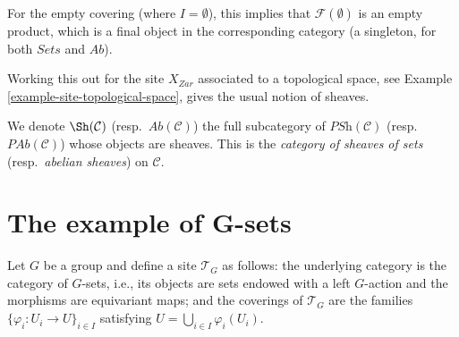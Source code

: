 \begin{remark}
\label{remark-empty-covering}
For the empty covering (where $I = \emptyset$), this implies that
$\mathcal{F}(\emptyset)$ is an empty product, which is a final object in the
corresponding category (a singleton, for both $\textit{Sets}$ and
$\textit{Ab}$).
\end{remark}

\begin{example}
\label{example-sheaf-site-space}
Working this out for the site $X_{Zar}$ associated to a topological
space, see Example \ref{example-site-topological-space}, gives the usual
notion of sheaves.
\end{example}

\begin{definition}
\label{definition-category-sheaves}
We denote $\Sh(\mathcal{C})$ (resp.\ $\textit{Ab}(\mathcal{C})$)
the full subcategory of $\textit{PSh}(\mathcal{C})$
(resp.\ $\textit{PAb}(\mathcal{C})$) whose objects are sheaves. This is the
{\it category of sheaves of sets} (resp.\ {\it abelian sheaves}) on
$\mathcal{C}$.
\end{definition}




\section{The example of G-sets}
\label{section-G-sets}

\noindent
Let $G$ be a group and define a site $\mathcal{T}_G$ as follows: the underlying
category is the category of $G$-sets, i.e., its objects are sets endowed
with a left $G$-action and the morphisms are equivariant maps; and the
coverings of $\mathcal{T}_G$ are the families
$\{\varphi_i : U_i \to U\}_{i\in I}$ satisfying
$U = \bigcup_{i\in I} \varphi_i(U_i)$.

